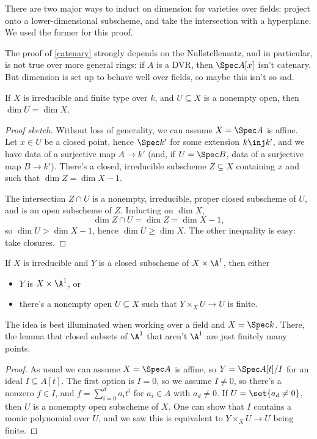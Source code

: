 There are two major ways to induct on dimension for varieties over fields: project onto a lower-dimensional
subscheme, and take the intersection with a hyperplane. We used the former for this proof.
\begin{rem}
The proof of \cref{catenary} strongly depends on the Nullstellensatz, and in particular, is not true over more
general rings: if $A$ is a DVR, then $\Spec A[x]$ isn't catenary. But dimension is set up to behave well over
fields, so maybe this isn't so sad.
\end{rem}
\begin{cor}
If $X$ is irreducible and finite type over $k$, and $U\subseteq X$ is a nonempty open, then $\dim U = \dim X$.
\end{cor}
\begin{proof}[Proof sketch]
Without loss of generality, we can assume $X = \Spec A$ is affine. Let $x \in U$ be a closed point, hence $\Spec
k'$ for some extension $k\inj k'$, and we have data of a surjective map $A\to k'$ (and, if $U = \Spec B$, data of a
surjective map $B\to k'$). There's a closed, irreducible subscheme $Z\subsetneq X$ containing $x$ and such that
$\dim Z = \dim X - 1$.

The intersection $Z\cap U$ is a nonempty, irreducible, proper closed subscheme of $U$, and is an open subscheme of
$Z$. Inducting on $\dim X$,
\begin{equation}
	\dim Z\cap U = \dim Z = \dim X - 1,
\end{equation}
so $\dim U > \dim X - 1$, hence $\dim U\ge\dim X$. The other inequality is easy: take closures.
\end{proof}
\begin{lem}
If $X$ is irreducible and $Y$ is a closed subscheme of $X\times\A^1$, then either
\begin{itemize}
	\item $Y$ is $X\times\A^1$, or
	\item there's a nonempty open $U\subseteq X$ such that $Y\times_X U\to U$ is finite.
\end{itemize}
\end{lem}

The idea is best illuminated when working over a field and $X = \Spec k$. There, the lemma that closed subsets of $\A^1$ that aren't $\A^1$ are just finitely many points.

\begin{proof}
As usual we can assume $X = \Spec A$ is affine, so $Y = \Spec A[t]/I$ for an ideal $I\subseteq A[t]$. The first
option is $I = 0$, so we assume $I \ne 0$, so there's a nonzero $f\in I$, and $f = \sum_{i=0}^d a_it^i$ for $a_i\in
A$ with $a_d\ne 0$. If $U = \set{a_d\ne 0}$, then $U$ is a nonempty open subscheme of $X$. One can show that $I$
contains a monic polynomial over $U$, and we saw this is equivalent to $Y\times_X U\to U$ being finite.
\end{proof}
